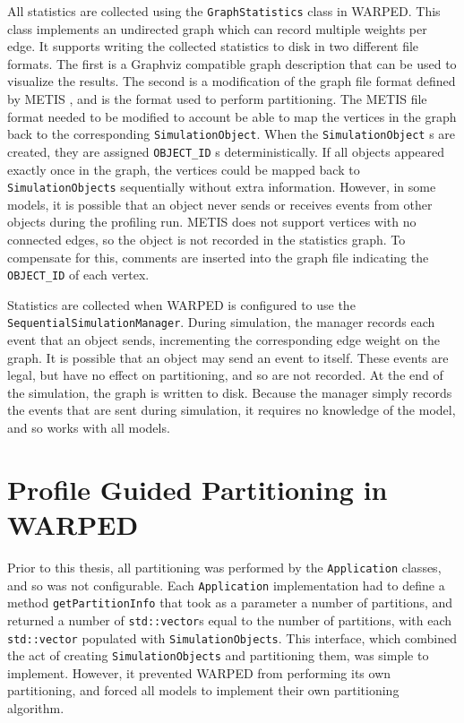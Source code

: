 \documentclass[11pt]{book}
\begin{document}
All statistics are collected using the \texttt{GraphStatistics} class in WARPED. This class implements an undirected graph which can record multiple weights per edge. It supports writing the collected statistics to disk in two different file formats. The first is a Graphviz compatible graph description that can be used to visualize the results. The second is a modification of the graph file format defined by METIS \cite{karypis-11}, and is the format used to perform partitioning. The METIS file format needed to be modified to account be able to map the vertices in the graph back to the corresponding \texttt{SimulationObject}. When the \texttt{SimulationObject} s are created, they are assigned \texttt{OBJECT\_ID} s deterministically. If all objects appeared exactly once in the graph, the vertices could be mapped back to \texttt{SimulationObjects} sequentially without extra information. However, in some models, it is possible that an object never sends or receives events from other objects during the profiling run. METIS does not support vertices with no connected edges, so the object is not recorded in the statistics graph. To compensate for this, comments are inserted into the graph file indicating the \texttt{OBJECT\_ID} of each vertex.

Statistics are collected when WARPED is configured to use the \texttt{SequentialSimulationManager}. During simulation, the manager records each event that an object sends, incrementing the corresponding edge weight on the graph. It is possible that an object may send an event to itself. These events are legal, but have no effect on partitioning, and so are not recorded. At the end of the simulation, the graph is written to disk. Because the manager simply records the events that are sent during simulation, it requires no knowledge of the model, and so works with all models. 

\section{Profile Guided Partitioning in WARPED}

Prior to this thesis, all partitioning was performed by the \texttt{Application} classes, and so was not configurable. Each \texttt{Application} implementation had to define a method \texttt{getPartitionInfo} that took as a parameter a number of partitions, and returned a number of \texttt{std::vector}s equal to the number of partitions, with each \texttt{std::vector} populated with \texttt{SimulationObjects}. This interface, which combined the act of creating \texttt{SimulationObjects} and partitioning them, was simple to implement. However, it prevented WARPED from performing its own partitioning, and forced all models to implement their own partitioning algorithm.
\end{document}
